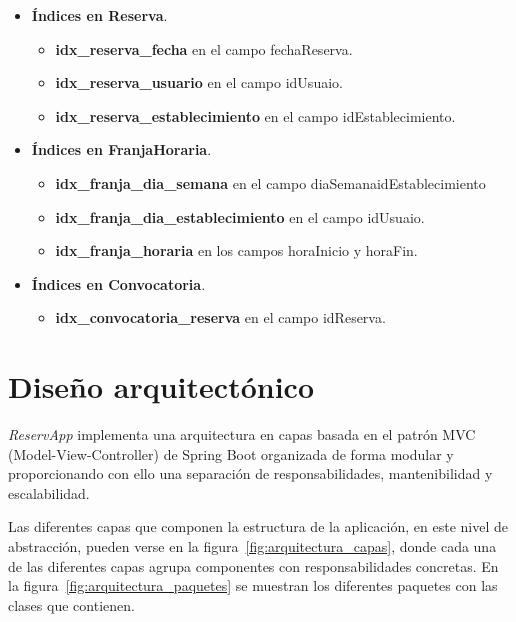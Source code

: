 \begin{itemize}
	\item \textbf{Índices en Reserva}.
	\begin{itemize}
       \item \textbf{idx\_reserva\_fecha} en el campo fechaReserva.
       \item \textbf{idx\_reserva\_usuario} en el campo idUsuaio.
       \item \textbf{idx\_reserva\_establecimiento} en el campo idEstablecimiento.
	\end{itemize}
\end{itemize}

\begin{itemize}
	\item \textbf{Índices en FranjaHoraria}.
	\begin{itemize}
       \item \textbf{idx\_franja\_dia\_semana} en el campo diaSemanaidEstablecimiento
       \item \textbf{idx\_franja\_dia\_establecimiento} en el campo idUsuaio.
       \item \textbf{idx\_franja\_horaria} en los campos horaInicio y horaFin.
	\end{itemize}
\end{itemize}

\begin{itemize}
	\item \textbf{Índices en Convocatoria}.
	\begin{itemize}
       \item \textbf{idx\_convocatoria\_reserva} en el campo idReserva.
	\end{itemize}
\end{itemize}

\newpage

\section{Diseño arquitectónico}

\textit{ReservApp} implementa una arquitectura en capas basada en el patrón MVC (Model-View-Controller) de Spring Boot organizada de forma modular y proporcionando con ello una separación de responsabilidades, mantenibilidad y escalabilidad.

Las diferentes capas que componen la estructura de la aplicación, en este nivel de abstracción, pueden verse en la figura~\ref{fig:arquitectura_capas}, donde cada una de las diferentes capas agrupa componentes con responsabilidades concretas. En la figura~\ref{fig:arquitectura_paquetes} se muestran los diferentes paquetes con las clases que contienen.

